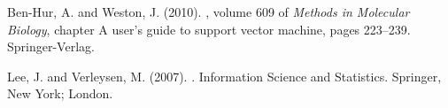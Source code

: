 \documentclass[a4paper,10pt]{scrartcl}
\begin{document}
% 
% 

\begin{thebibliography}{}

Ben-Hur, A. and Weston, J. (2010).
, volume 609 of
  {\em Methods in Molecular Biology}, chapter A user's guide to support vector
  machine, pages 223--239.
\newblock Springer-Verlag.

Lee, J. and Verleysen, M. (2007).
.
\newblock Information Science and Statistics. Springer, New York; London.

\end{thebibliography}
\end{document}
